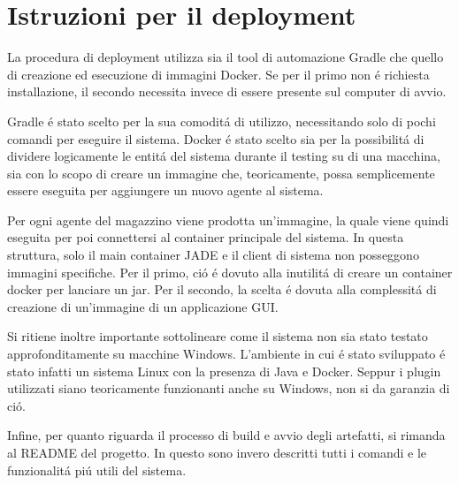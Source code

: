 \section{Istruzioni per il deployment}


La procedura di deployment utilizza sia il tool di automazione Gradle che quello di creazione ed esecuzione di immagini Docker. Se per il primo non \'e richiesta installazione, il secondo necessita invece di essere presente sul computer di avvio.

Gradle \'e stato scelto per la sua comodit\'a di utilizzo, necessitando solo di pochi comandi per eseguire il sistema. Docker \'e stato scelto sia per la possibilit\'a di dividere logicamente le entit\'a del sistema durante il testing su di una macchina, sia con lo scopo di creare un immagine che, teoricamente, possa semplicemente essere eseguita per aggiungere un nuovo agente al sistema.

\parag
Per ogni agente del magazzino viene prodotta un'immagine, la quale viene quindi eseguita per poi connettersi al container principale del sistema. In questa struttura, solo il main container JADE e il client di sistema non posseggono immagini specifiche. Per il primo, ci\'o \'e dovuto alla inutilit\'a di creare un container docker per lanciare un jar. Per il secondo, la scelta \'e dovuta alla complessit\'a di creazione di un'immagine di un applicazione GUI.

\parag
Si ritiene inoltre importante sottolineare come il sistema non sia stato testato approfonditamente su macchine Windows. L'ambiente in cui \'e stato sviluppato \'e stato infatti un sistema Linux con la presenza di Java e Docker. Seppur i plugin utilizzati siano teoricamente funzionanti anche su Windows, non si da garanzia di ci\'o.

\parag
Infine, per quanto riguarda il processo di build e avvio degli artefatti, si rimanda al README del progetto. In questo sono invero descritti tutti i comandi e le funzionalit\'a pi\'u utili del sistema.
